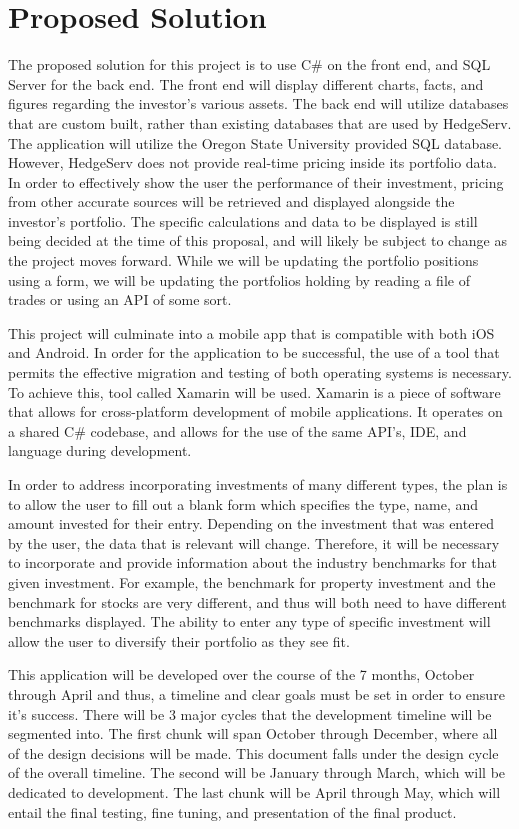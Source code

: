 \documentclass[onecolumn, draftclsnofoot,10pt, compsoc]{IEEEtran}
\begin{document}
\section{Proposed Solution}
The proposed solution for this project is to use C\# on the front end, and SQL Server for the back end. The front end will display different charts, facts, and figures regarding the investor’s various assets. The back end will utilize databases that are custom built, rather than existing databases that are used by HedgeServ. The application will utilize the Oregon State University provided SQL database. However, HedgeServ does not provide real-time pricing inside its portfolio data. In order to effectively show the user the performance of their investment, pricing from other accurate sources will be retrieved and displayed alongside the investor’s portfolio. The specific calculations and data to be displayed is still being decided at the time of this proposal, and will likely be subject to change as the project moves forward. While we will be updating the portfolio positions using a form, we will be updating the portfolios holding by reading a file of trades or using an API of some sort.

This project will culminate into a mobile app that is compatible with both iOS and Android. In order for the application to be successful, the use of a tool that permits the effective migration and testing of both operating systems is necessary. To achieve this, tool called Xamarin will be used. Xamarin is a piece of software that allows for cross-platform development of mobile applications. It operates on a shared C\# codebase, and allows for the use of the same API’s, IDE, and language during development. 

In order to address incorporating investments of many different types, the plan is to allow the user to fill out a blank form which specifies the type, name, and amount invested for their entry. Depending on the investment that was entered by the user, the data that is relevant will change. Therefore, it will be necessary to incorporate and provide information about the industry benchmarks for that given investment. For example, the benchmark for property investment and the benchmark for stocks are very different, and thus will both need to have different benchmarks displayed. The ability to enter any type of specific investment will allow the user to diversify their portfolio as they see fit.

This application will be developed over the course of the 7 months, October through April and thus, a timeline and clear goals must be set in order to ensure it’s success. There will be 3 major cycles that the development timeline will be segmented into. The first chunk will span October through December, where all of the design decisions will be made. This document falls under the design cycle of the overall timeline. The second will be January through March, which will be dedicated to development. The last chunk will be April through May, which will entail the final testing,  fine tuning, and presentation of the final product.
\end{document}
